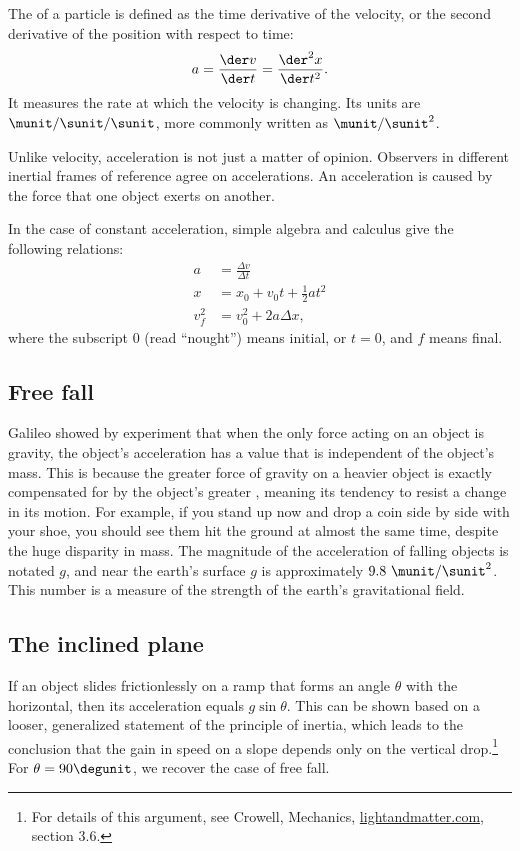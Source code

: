 The 
of a particle is defined as the time derivative of the velocity, or
the second derivative of the position with respect to time:
\begin{equation}
  a = \frac{\der v}{\der t} = \frac{\der^2 x}{\der t^2}.
\end{equation}
It measures the rate at which the velocity is changing.
Its units are $\munit/\sunit/\sunit$, more commonly written as $\munit/\sunit^2$.

Unlike velocity, acceleration is not just a matter of opinion.
Observers in different inertial frames of reference agree on accelerations.
An acceleration is caused by the force that one object exerts on another.

In the case of constant acceleration, simple algebra and calculus give the following relations:
\begin{align}
  a &= \frac{\Delta v}{\Delta t} \\
  x &= x_0+v_0t+\frac{1}{2}at^2 \\
  v_f^2 &= v_0^2 + 2a\Delta x,
\end{align}
where the subscript $0$ (read ``nought'') means initial, or $t=0$, and
$f$ means final.

\subsection{Free fall}

Galileo showed by experiment
that when the only force acting on an object is gravity, the object's acceleration
has a value that is independent of the object's mass. This is because the greater
force of gravity on a heavier object is exactly compensated for by the object's
greater , meaning its tendency to resist a change in its motion.
For example, if you stand up now and drop a coin side by side with your shoe, you
should see them hit the ground at almost the same time, despite the huge disparity
in mass. The magnitude of the acceleration of falling objects is notated 
$g$, and near the earth's
surface $g$ is approximately $9.8\ \munit/\sunit^2$. This number is a measure of
the strength of the earth's gravitational field.

\subsection{The inclined plane}\label{inclined-plane}
If an object slides frictionlessly on a ramp that forms an angle $\theta$ with the
horizontal, then its acceleration equals $g\sin\theta$. This can be shown
based on a looser, generalized statement of the principle of inertia,
which leads to the conclusion that the gain in speed on a slope depends only
on the vertical drop.\footnote{For details of this argument, see Crowell, Mechanics, \url{lightandmatter.com}, section 3.6.}
For $\theta=90\degunit$, we recover the case of free fall.

